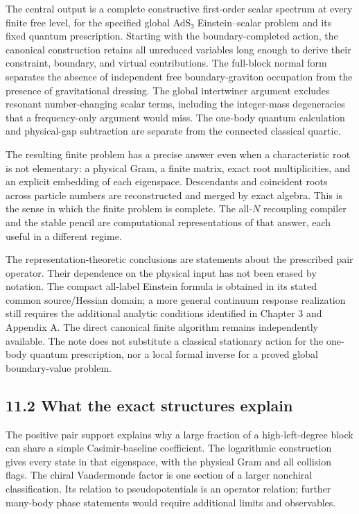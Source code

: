 \documentclass[a4paper,11pt]{article}
\numberwithin{equation}{section}
\begin{document}
The central output is a complete constructive first-order scalar spectrum at every finite free level, for the specified global AdS₃ Einstein--scalar problem and its fixed quantum prescription. Starting with the boundary-completed action, the canonical construction retains all unreduced variables long enough to derive their constraint, boundary, and virtual contributions. The full-block normal form separates the absence of independent free boundary-graviton occupation from the presence of gravitational dressing. The global intertwiner argument excludes resonant number-changing scalar terms, including the integer-mass degeneracies that a frequency-only argument would miss. The one-body quantum calculation and physical-gap subtraction are separate from the connected classical quartic.

The resulting finite problem has a precise answer even when a characteristic root is not elementary: a physical Gram, a finite matrix, exact root multiplicities, and an explicit embedding of each eigenspace. Descendants and coincident roots across particle numbers are reconstructed and merged by exact algebra. This is the sense in which the finite problem is complete. The all-\(N\) recoupling compiler and the stable pencil are computational representations of that answer, each useful in a different regime.

The representation-theoretic conclusions are statements about the prescribed pair operator. Their dependence on the physical input has not been erased by notation. The compact all-label Einstein formula is obtained in its stated common source/Hessian domain; a more general continuum response realization still requires the additional analytic conditions identified in Chapter 3 and Appendix A. The direct canonical finite algorithm remains independently available. The note does not substitute a classical stationary action for the one-body quantum prescription, nor a local formal inverse for a proved global boundary-value problem.

\hypertarget{what-the-exact-structures-explain}{%
\subsection{11.2 What the exact structures explain}\label{what-the-exact-structures-explain}}

The positive pair support explains why a large fraction of a high-left-degree block can share a simple Casimir-baseline coefficient. The logarithmic construction gives every state in that eigenspace, with the physical Gram and all collision flags. The chiral Vandermonde factor is one section of a larger nonchiral classification. Its relation to pseudopotentials is an operator relation; further many-body phase statements would require additional limits and observables.
\end{document}
